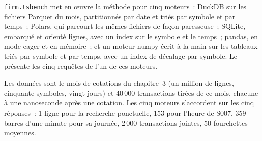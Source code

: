 \texttt{firm.tsbench} met en œuvre la méthode pour cinq moteurs~: DuckDB sur les fichiers Parquet du mois, partitionnés par date et
triés par symbole et par temps~; Polars, qui parcourt les mêmes fichiers de façon paresseuse~; SQLite, embarqué et orienté lignes, avec un index sur le symbole et
le temps~; pandas, en mode eager et en mémoire~; et un moteur numpy écrit à la main sur les tableaux triés par symbole et par temps, avec un
index de décalage par symbole. Le  présente les cinq requêtes de l'un de ces moteurs.

\label{lst:pl:time-series-databases-and-the-alternatives:duck}

Les données sont le mois de cotations du chapitre~3 (un million de lignes, cinquante symboles, vingt jours) et 40\,000 transactions tirées de ce mois, chacune
à une nanoseconde après une cotation. Les cinq moteurs s'accordent sur les cinq réponses~: 1 ligne pour la recherche ponctuelle, 153 pour l'heure de S007,
359 barres d'une minute pour sa journée, 2\,000 transactions jointes, 50 fourchettes moyennes.

